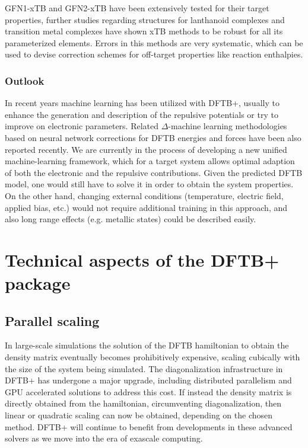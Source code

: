 \documentclass[reprint,onecolumn,superscriptaddress]{revtex4-1}
\newcommand{\dftbp}{DFTB+}
\begin{document}
GFN1-xTB and GFN2-xTB have been extensively tested for their target
properties,\cite{bannwarth2019} further studies regarding structures for
lanthanoid complexes\cite{bursch2017} and transition metal
complexes\cite{bursch2019} have shown xTB methods to be robust for all its
parameterized elements.  Errors in this methods are very systematic, which can
be used to devise correction schemes for off-target properties like reaction
enthalpies.\cite{kromann2018}

\subsubsection{Outlook}

In recent years machine learning has been utilized with \dftbp{}, usually to
enhance the generation and description of the repulsive potentials
\cite{Knaup2007, Kranz2018, Zhu2019, Huran2018, Goldman2018} or try to improve
on electronic parameters.\cite{Li2018, Huran2018} Related $\Delta$-machine
learning\cite{Ramakrishnan2015} methodologies based on neural network
corrections for DFTB energies and forces have been also reported
recently.\cite{Shen2016, Shen2018} We are currently in the process of developing
a new unified machine-learning framework, which for a target system allows
optimal adaption of both the electronic and the repulsive contributions. Given
the predicted DFTB model, one would still have to solve it in order to obtain
the system properties. On the other hand, changing external conditions
(temperature, electric field, applied bias, etc.) would not require additional
training in this approach, and also long range effects (e.g. metallic states)
could be described easily.


\section{Technical aspects of the \dftbp{} package}


\subsection{Parallel scaling}

In large-scale simulations the solution of the DFTB hamiltonian to obtain the
density matrix eventually becomes prohibitively expensive, scaling cubically
with the size of the system being simulated. The diagonalization infrastructure
in \dftbp{} has undergone a major upgrade, including distributed parallelism and
GPU accelerated solutions to address this cost. If instead the density matrix is
directly obtained from the hamiltonian, circumventing diagonalization, then
linear or quadratic scaling can now be obtained, depending on the chosen method.
\dftbp{} will continue to benefit from developments in these advanced solvers as
we move into the era of exascale computing.
\end{document}
